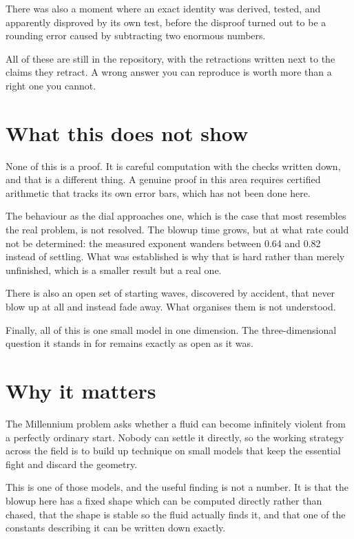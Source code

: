 \documentclass[11pt,a4paper]{article}
\begin{document}
There was also a moment where an exact identity was derived, tested, and
apparently disproved by its own test, before the disproof turned out to be a
rounding error caused by subtracting two enormous numbers.

\begin{keybox}
All of these are still in the repository, with the retractions written next to
the claims they retract. A wrong answer you can reproduce is worth more than a
right one you cannot.
\end{keybox}

\section{What this does not show}

None of this is a proof. It is careful computation with the checks written
down, and that is a different thing. A genuine proof in this area requires
certified arithmetic that tracks its own error bars, which has not been done
here.

The behaviour as the dial approaches one, which is the case that most resembles
the real problem, is not resolved. The blowup time grows, but at what rate
could not be determined: the measured exponent wanders between 0.64 and 0.82
instead of settling. What was established is why that is hard rather than
merely unfinished, which is a smaller result but a real one.

There is also an open set of starting waves, discovered by accident, that never
blow up at all and instead fade away. What organises them is not understood.

Finally, all of this is one small model in one dimension. The three-dimensional
question it stands in for remains exactly as open as it was.

\section{Why it matters}

The Millennium problem asks whether a fluid can become infinitely violent from
a perfectly ordinary start. Nobody can settle it directly, so the working
strategy across the field is to build up technique on small models that keep
the essential fight and discard the geometry.

This is one of those models, and the useful finding is not a number. It is that
the blowup here has a fixed shape which can be computed directly rather than
chased, that the shape is stable so the fluid actually finds it, and that one
of the constants describing it can be written down exactly.
\end{document}
